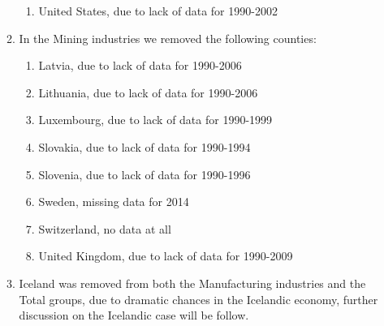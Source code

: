 \documentclass[]{amsart}
\begin{document}
\begin{appendices}
\begin{enumerate}
\begin{enumerate}
\begin{enumerate}
        \item United States, due to lack of data for 1990-2002
 		\end{enumerate}
	\item In the Mining industries we removed the following counties:
		\begin{enumerate}   	 
        \item Latvia, due to lack of data for 1990-2006
        \item Lithuania, due to lack of data for 1990-2006
        \item Luxembourg, due to lack of data for 1990-1999
        \item Slovakia, due to lack of data for 1990-1994
        \item Slovenia, due to lack of data for 1990-1996
        \item Sweden, missing data for 2014
        \item Switzerland, no data at all
        \item United Kingdom, due to lack of data for 1990-2009
  		\end{enumerate}
  	\item Iceland was removed from both the Manufacturing industries and the Total groups, due to dramatic chances in the Icelandic economy, further discussion on the Icelandic case will be follow.
  	\end{enumerate}
\end{enumerate}

\newpage




\newpage
\setcounter{table}{0} \renewcommand{\thetable}{B\arabic{table}}

	\end{appendices}
 
\end{document}
